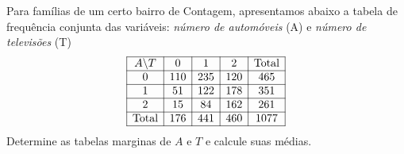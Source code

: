 %
%


\begin{exercicioBanco}[\valorquestao]
    Para famílias de um certo bairro de Contagem, apresentamos abaixo a tabela de frequência conjunta das variáveis: \textit{número de automóveis} (A) e \textit{número de televisões} (T)
    \[
    \begin{array}{|c|c|c|c|c|}
        \hline
        A\backslash T & 0 & 1 & 2 & \text{Total} \\
        \hline
        0 & 110 & 235 & 120 & 465 \\
        \hline
        1 & 51 & 122 & 178 & 351 \\
        \hline
        2 & 15 & 84 & 162 & 261 \\
        \hline
        \text{Total} & 176 & 441 & 460 & 1077 \\
        \hline
    \end{array}
    \]
    Determine as tabelas marginas de \(A\) e \(T\) e calcule suas médias.
\end{exercicioBanco}

